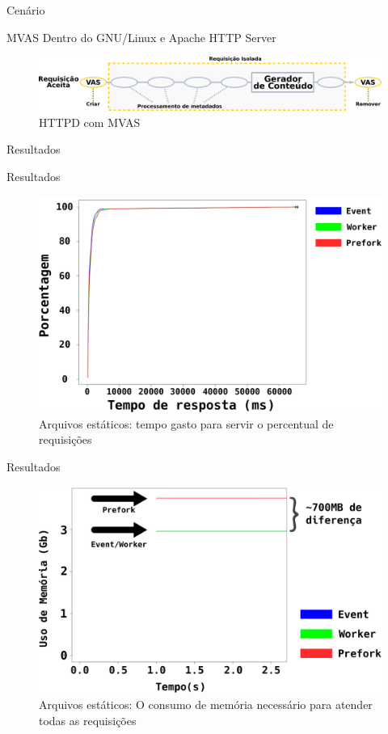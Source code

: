 \documentclass[xcolor={usenames,svgnames,dvipsnames},brazil,english,12pt,aspectratio=149]{beamer}
\begin{document}
\begin{frame}{Cenário}
	
\end{frame}

\begin{frame}{MVAS Dentro do GNU/Linux e Apache HTTP Server}
	\begin{figure}[!h]
		\centering
		\includegraphics[width=\textwidth]{mvas_httpd}
		\caption{HTTPD com MVAS}
		\label{fig:httpd_mvas}
	\end{figure}
\end{frame}

\begin{frame}{Resultados}
	
\end{frame}

\begin{frame}{Resultados}
	\begin{figure}[!h]
		\centering
		\includegraphics[width=.60\textwidth]{static_file}
		\caption{Arquivos estáticos: tempo gasto para servir o percentual de requisições}
		\label{fig:static_file}
	\end{figure}
\end{frame}

\begin{frame}{Resultados}
	\begin{figure}[!h]
		\centering
		\includegraphics[width=.70\textwidth]{static_file_memory_usage}
		\caption{Arquivos estáticos: O consumo de memória necessário para atender todas as requisições}
		\label{fig:static_file_memory}
	\end{figure}
\end{frame}
\end{document}
